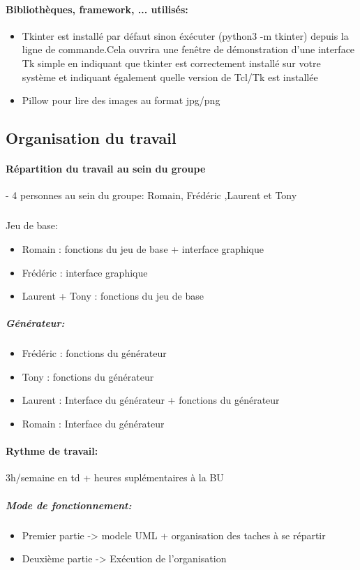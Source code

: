 \documentclass[a4paper]{article}
\begin{document}
\paragraph*{Bibliothèques, framework, ... utilisés:}
\begin{itemize}
\item Tkinter est installé par défaut sinon éxécuter (python3 -m tkinter) depuis la ligne de commande.Cela ouvrira une fenêtre de démonstration d'une interface Tk simple en indiquant que tkinter est correctement installé sur votre système et indiquant également quelle version de Tcl/Tk est installée\\
\item Pillow pour lire des images au format jpg/png
\end{itemize}

\subsection{Organisation du travail}
\paragraph{Répartition du travail au sein du groupe}

  - 4 personnes au sein du groupe: Romain, Frédéric ,Laurent et Tony
  \subparagraph{}
  Jeu de base:
  \begin{itemize}
  \item Romain : fonctions du jeu de base + interface graphique
  \item Frédéric : interface graphique
  \item Laurent + Tony : fonctions du jeu de base
  \end{itemize}

  \subparagraph{Générateur:}

  \begin{itemize}
    \item Frédéric : fonctions du générateur
    \item Tony : fonctions du générateur
    \item Laurent : Interface du générateur + fonctions du générateur 
    \item Romain : Interface du générateur
  \end{itemize}
   
   
  \paragraph{Rythme de travail:} 3h/semaine en td + heures suplémentaires à la BU \\
 \subparagraph{Mode de fonctionnement:}
 \begin{itemize}
 \item Premier partie ->   modele UML + organisation des taches à se répartir\\
 \item Deuxième partie ->  Exécution de l'organisation  
 \end{itemize}
\end{document}
